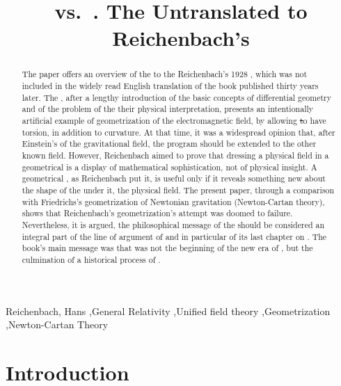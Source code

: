 \documentclass[submitted]{article}
\title{\scare{Geometrization of Physics} vs.\ \scare{Physicalization of Geometry}. The Untranslated \Ap to Reichenbach's \PRZL}
\newcommand{\PRZL}{\citetitle{Reichenbach1928}\xspace}
\begin{document}
\maketitle


\begin{abstract}
The paper offers an overview of the \Ap to the Reichenbach's 1928 \PRZL, which was not included in the widely read English translation of the book published thirty years later. The \Ap, after a lengthy introduction of the basic concepts of differential geometry and of the problem of the their physical interpretation, presents an intentionally artificial example of geometrization of the electromagnetic field, by allowing \st to have torsion, in addition to curvature. At that time, it was a widespread opinion that, after Einstein's  of the gravitational field, the  program should be extended to the other known field. However, Reichenbach aimed to prove that dressing a physical field in a geometrical  is a display of mathematical sophistication, not of physical insight. A geometrical , as Reichenbach put it, is useful only if it reveals something new about the shape of the  under it, the physical field. The present paper, through a comparison with Friedrichs's geometrization of Newtonian gravitation (Newton-Cartan theory), shows that Reichenbach's geometrization's attempt was doomed to failure. Nevertheless, it is argued, the philosophical message of the \Ap should be considered an integral part of the line of argument of \PRZL and in particular of its last chapter on \gr. The book's main message was that \gr was not the beginning of the new era of , but the culmination of a historical process of .
\end{abstract}



\begin{keywords}
Reichenbach, Hans \sep General Relativity \sep Unified field theory \sep Geometrization 
\sep Newton-Cartan Theory
\end{keywords}


\section*{Introduction}
\end{document}
